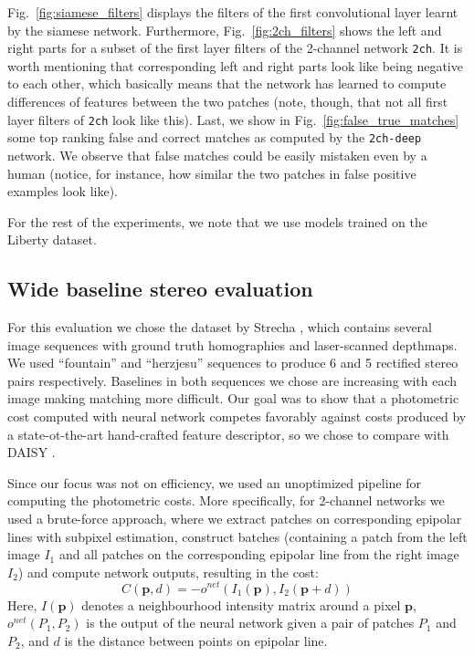 \documentclass[10pt,twocolumn,letterpaper]{article}
\begin{document}
Fig.~\ref{fig:siamese_filters} displays the filters of the first convolutional layer learnt by the siamese network. Furthermore, Fig.~\ref{fig:2ch_filters} shows the left and right parts for a subset of the first layer filters of the 2-channel network \texttt{2ch}. It is worth mentioning that corresponding left and right parts look like being negative to each other, which basically means that the network has learned to  compute differences of features between the two patches 
(note, though, that not all first layer filters of \texttt{2ch}  look like this). Last, we show in Fig.~\ref{fig:false_true_matches} some top ranking false and  correct matches as computed by the \texttt{2ch-deep} network. We observe that false matches could be easily mistaken even by a human (notice, for instance, how similar the two patches in false positive examples look like).

 


For the rest of the experiments, we note that we use models trained on the Liberty dataset.


\subsection{Wide baseline stereo evaluation}

For this evaluation we chose the dataset by Strecha \etal\cite{StrechaDataset}, which contains several image sequences with ground truth homographies and 
laser-scanned depthmaps. We used ``fountain'' and ``herzjesu'' sequences to produce 6 and 5
rectified stereo pairs respectively. Baselines in both sequences we chose are 
increasing with each image making matching more difficult. Our goal was to show that 
a photometric cost computed with neural network competes favorably against costs produced
by a state-ot-the-art hand-crafted feature descriptor, so we chose to compare with DAISY \cite{Tola08}.

Since our focus was not on efficiency, we used an unoptimized pipeline for computing the photometric costs. More specifically,  for 2-channel networks we used a brute-force approach, where we extract patches on corresponding epipolar lines with subpixel estimation, construct
batches (containing a patch from the left image $I_1$ and all patches on the corresponding epipolar 
line from the right image $I_2$) and compute network outputs, resulting in the cost:
\begin{equation}
  C(\mathbf{p},d) =  - o^{net}(I_1(\mathbf{p}), I_2(\mathbf{p} + d))
  \label{eq:cnet}
\end{equation}
Here,  $I(\mathbf{p})$ denotes a neighbourhood intensity matrix around a pixel $\mathbf{p}$,
$o^{net}(P_1, P_2)$ is the output of the neural network given a pair of patches
$P_1$ and $P_2$, and $d$ is the  distance between points on epipolar line.
\end{document}
